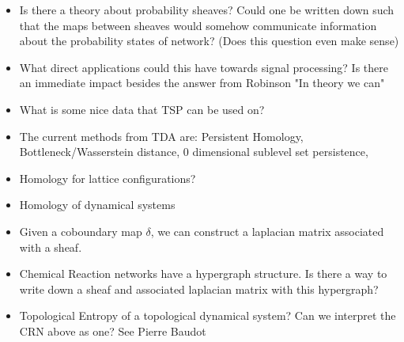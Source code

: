 \documentclass[12pt]{article}
\theoremstyle{plain}
\theoremstyle{definition}
\begin{document}
\begin{itemize}
  \item Is there a theory about probability sheaves? Could one be written down such that
    the maps between sheaves would somehow communicate information about the probability 
    states of network? (Does this question even make sense)

  \item What direct applications could this have towards signal processing? Is there an immediate
    impact besides the answer from Robinson "In theory we can"

  \item What is some nice data that TSP can be used on?

  \item The current methods from TDA are: Persistent Homology, Bottleneck/Wasserstein distance, 
    0 dimensional sublevel set persistence, 

  \item Homology for lattice configurations?

  \item Homology of dynamical systems

  \item Given a coboundary map $\delta$, we can construct a laplacian matrix associated with a sheaf.

  \item Chemical Reaction networks have a hypergraph structure. Is there a way to write down a sheaf and associated
    laplacian matrix with this hypergraph?

  \item Topological Entropy of a topological dynamical system? Can we interpret the CRN above as one? See Pierre Baudot

\end{itemize}
\end{document}
